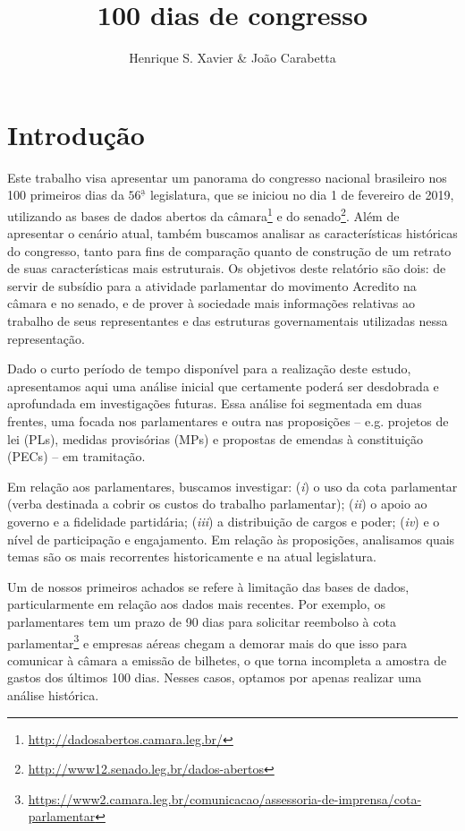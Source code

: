 \documentclass[12pt,a4paper]{article}
\author{Henrique S. Xavier \& João Carabetta}
\title{\Huge\sffamily\bfseries 100 dias de congresso}
\newcommand{\myurl}[1]{{\tiny\url{#1}}}
\begin{document}
\thispagestyle{empty}
\maketitle
\pagebreak

\thispagestyle{plain}

\section{Introdução}
\label{sec:intro}

Este trabalho visa apresentar um panorama do congresso nacional brasileiro nos 100 primeiros dias da $56^{\mathrm{\underline{a}}}$ legislatura, que
se iniciou no dia 1 de fevereiro de 2019, utilizando as bases de dados abertos da câmara\footnote{\myurl{http://dadosabertos.camara.leg.br/}}
e do senado\footnote{\myurl{http://www12.senado.leg.br/dados-abertos}}. Além de apresentar o cenário atual, também buscamos analisar
as características históricas do congresso, tanto para fins de comparação quanto de construção de um retrato de suas características
mais estruturais. Os objetivos deste relatório são dois: de servir de subsídio para a atividade parlamentar do movimento Acredito na
câmara e no senado, e de prover à sociedade mais informações relativas ao trabalho de seus representantes e das estruturas governamentais
utilizadas nessa representação.

Dado o curto período de tempo disponível para a realização deste estudo, apresentamos aqui uma análise inicial que
certamente poderá ser desdobrada e aprofundada em investigações futuras. Essa análise foi segmentada em duas frentes,
uma focada nos parlamentares e outra nas proposições -- e.g. projetos de lei (PLs), medidas provisórias (MPs) e propostas
de emendas à constituição (PECs) -- em tramitação.

Em relação aos parlamentares, buscamos investigar:
(\emph{i}) o uso da cota parlamentar (verba destinada a cobrir os custos do trabalho parlamentar);
(\emph{ii}) o apoio ao governo e a fidelidade partidária;
(\emph{iii}) a distribuição de cargos e poder;
(\emph{iv}) e o nível de participação e engajamento.
Em relação às proposições, analisamos quais temas são os mais recorrentes historicamente e na atual legislatura.

Um de nossos primeiros achados se refere à limitação das bases de dados, particularmente em relação
aos dados mais recentes. Por exemplo, os parlamentares tem um prazo de 90 dias para solicitar reembolso
à cota parlamentar\footnote{\myurl{https://www2.camara.leg.br/comunicacao/assessoria-de-imprensa/cota-parlamentar}}
e empresas aéreas chegam a demorar mais do que isso para comunicar à câmara a emissão de
bilhetes, o que torna incompleta a amostra de gastos dos últimos 100 dias. Nesses casos, optamos por apenas
realizar uma análise histórica.
\end{document}
